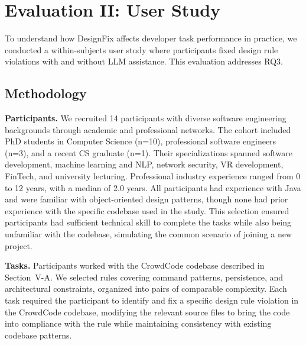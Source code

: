 \documentclass[conference]{IEEEtran}
\begin{document}
\section{Evaluation II: User Study}

To understand how DesignFix affects developer task performance in practice, we conducted a within-subjects user study where participants fixed design rule violations with and without LLM assistance. This evaluation addresses RQ3.

\subsection{Methodology}

\textbf{Participants.} We recruited 14 participants with diverse software engineering backgrounds through academic and professional networks. The cohort included PhD students in Computer Science (n=10), professional software engineers (n=3), and a recent CS graduate (n=1). Their specializations spanned software development, machine learning and NLP, network security, VR development, FinTech, and university lecturing. Professional industry experience ranged from 0 to 12 years, with a median of 2.0 years. All participants had experience with Java and were familiar with object-oriented design patterns, though none had prior experience with the specific codebase used in the study. This selection ensured participants had sufficient technical skill to complete the tasks while also being unfamiliar with the codebase, simulating the common scenario of joining a new project.

\textbf{Tasks.} Participants worked with the CrowdCode codebase described in Section~V-A. We selected rules covering command patterns, persistence, and architectural constraints, organized into pairs of comparable complexity.
Each task required the participant to identify and fix a specific design rule violation in the CrowdCode codebase, modifying the relevant source files to bring the code into compliance with the rule while maintaining consistency with existing codebase patterns.
\end{document}
